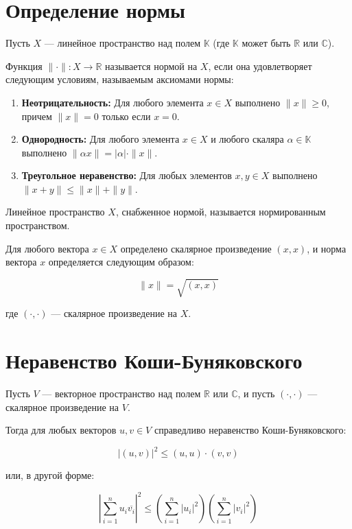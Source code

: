 \documentclass{article}
\begin{document}
\section*{Определение нормы}

Пусть $X$ — линейное пространство над полем $\mathbb{K}$ (где $\mathbb{K}$ может быть $\mathbb{R}$ или $\mathbb{C}$).

Функция $\| \cdot \| : X \to \mathbb{R}$ называется нормой на $X$, если она удовлетворяет следующим условиям, называемым аксиомами нормы:

\begin{enumerate}
    \item \textbf{Неотрицательность:} Для любого элемента $x \in X$ выполнено $\| x \| \geq 0$, причем $\| x \| = 0$ только если $x = 0$.
    
    \item \textbf{Однородность:} Для любого элемента $x \in X$ и любого скаляра $\alpha \in \mathbb{K}$ выполнено $\| \alpha x \| = |\alpha| \cdot \| x \|$.
    
    \item \textbf{Треугольное неравенство:} Для любых элементов $x, y \in X$ выполнено $\| x + y \| \leq \| x \| + \| y \|$.
\end{enumerate}

Линейное пространство $X$, снабженное нормой, называется нормированным пространством.

Для любого вектора $x \in X$ определено скалярное произведение $(x, x)$, и норма вектора $x$ определяется следующим образом:

\[
\| x \| = \sqrt{(x, x)}
\]

где $(\cdot, \cdot)$ — скалярное произведение на $X$.

\section*{Неравенство Коши-Буняковского}

Пусть $V$ — векторное пространство над полем $\mathbb{R}$ или $\mathbb{C}$, и пусть $(\cdot, \cdot)$ — скалярное произведение на $V$. 

Тогда для любых векторов $u, v \in V$ справедливо неравенство Коши-Буняковского:

\[
| (u, v) |^2 \leq (u, u) \cdot (v, v)
\]

или, в другой форме:

\[
\left| \sum_{i=1}^{n} u_i \overline{v_i} \right|^2 \leq \left( \sum_{i=1}^{n} |u_i|^2 \right) \left( \sum_{i=1}^{n} |v_i|^2 \right)
\]
\end{document}

